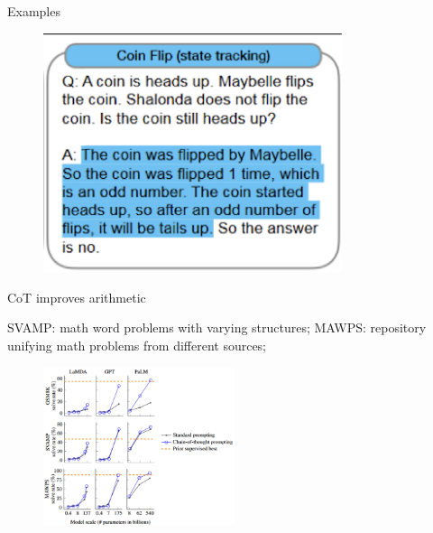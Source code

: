 \begin{vbframe}{Examples}

\vfill

\begin{figure}
    \centering
    \includegraphics[height=7cm]{figure/cotex6.png}
\end{figure}

\vfill

\end{vbframe}


\begin{vbframe}{CoT improves arithmetic}


SVAMP: math word problems with varying structures; MAWPS:
repository unifying math problems from different sources;

\begin{figure}
    \centering
    \includegraphics[width=0.5\textwidth]{figure/cot_performance1.png}
\end{figure}


\end{vbframe}

